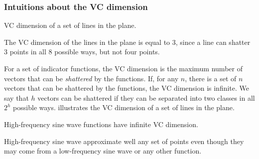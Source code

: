 \subsubsection{Intuitions about the VC dimension}

\begin{figurebox}[label=fig:vc-dimension]{VC dimension of a set of lines in the plane.}
  \centering
  \tcblower
  The VC dimension of the lines in the plane is equal to 3, since a line can shatter 3
  points in all 8 possible ways, but not four points.
\end{figurebox}

For a set of indicator functions, the VC dimension is the maximum number of vectors that
can be \emph{shattered} by the functions.  If, for any $n$, there is a set of $n$
vectors that can be shattered by the functions, the VC dimension is infinite.
We say that $h$ vectors can be shattered if they can be separated into two classes in all
$2^h$ possible ways.   illustrates the VC dimension of a set of
lines in the plane.

\begin{figurebox}[label=fig:vc-sin]{High-frequency sine wave functions have infinite VC dimension.}
  \centering
  \tcblower
  High-frequency sine wave approximate well any set of points even though they may come
  from a low-frequency sine wave or any other function.
\end{figurebox}

